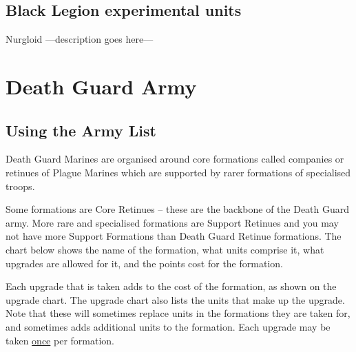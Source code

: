 \documentclass[a4paper, twocolumn]{article}
\begin{document}

\clearpage
\subsection{Black Legion experimental units}

\unit{Nurgloid} {							%
	---description goes here---
}
\statsEND									%

\twocolumn
%
\clearpage
\section{Death Guard Army}
\subsection{Using the Army List}
Death Guard Marines are organised around core formations
called companies or retinues of Plague Marines which are
supported by rarer formations of specialised troops.

Some formations are Core Retinues – these are the backbone
of the Death Guard army. More rare and specialised
formations are Support Retinues and you may not have more
Support Formations than Death Guard Retinue formations.
The chart below shows the name of the formation, what units
comprise it, what upgrades are allowed for it, and the points
cost for the formation.

Each upgrade that is taken adds to the cost of the formation,
as shown on the upgrade chart. The upgrade chart also lists
the units that make up the upgrade. Note that these will
sometimes replace units in the formations they are taken for,
and sometimes adds additional units to the formation. Each
upgrade may be taken \underline{once} per formation.

\end{document}
